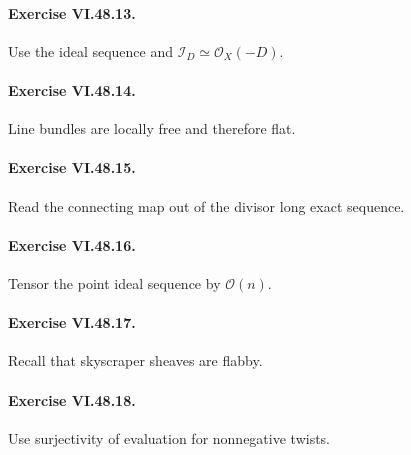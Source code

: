 \paragraph{Exercise VI.48.13.}
\begin{hint}
Use the ideal sequence and \(\mathcal I_D\simeq\mathcal O_X(-D)\).
\end{hint}

\paragraph{Exercise VI.48.14.}
\begin{hint}
Line bundles are locally free and therefore flat.
\end{hint}

\paragraph{Exercise VI.48.15.}
\begin{hint}
Read the connecting map out of the divisor long exact sequence.
\end{hint}

\paragraph{Exercise VI.48.16.}
\begin{hint}
Tensor the point ideal sequence by \(\mathcal O(n)\).
\end{hint}

\paragraph{Exercise VI.48.17.}
\begin{hint}
Recall that skyscraper sheaves are flabby.
\end{hint}

\paragraph{Exercise VI.48.18.}
\begin{hint}
Use surjectivity of evaluation for nonnegative twists.
\end{hint}

